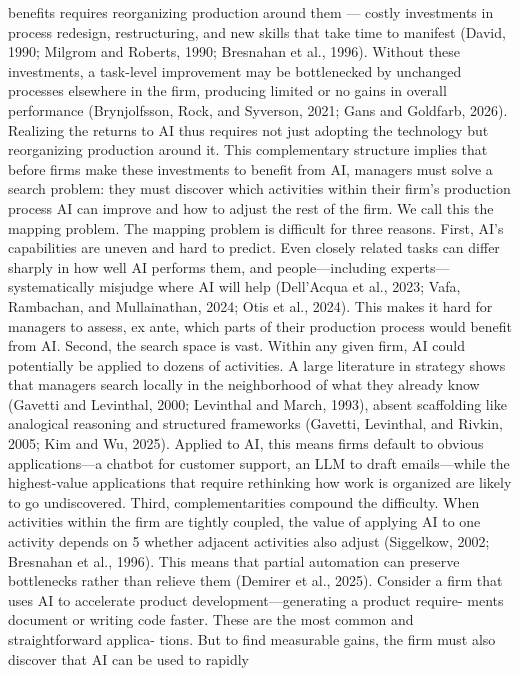 benefits requires reorganizing production around them — costly investments in process redesign,
restructuring, and new skills that take time to manifest (David, 1990; Milgrom and Roberts, 1990;
Bresnahan et al., 1996). Without these investments, a task-level improvement may be bottlenecked
by unchanged processes elsewhere in the firm, producing limited or no gains in overall performance
(Brynjolfsson, Rock, and Syverson, 2021; Gans and Goldfarb, 2026). Realizing the returns to AI
thus requires not just adopting the technology but reorganizing production around it.
This complementary structure implies that before firms make these investments to benefit from
AI, managers must solve a search problem: they must discover which activities within their firm’s
production process AI can improve and how to adjust the rest of the firm. We call this the mapping
problem.
The mapping problem is difficult for three reasons.
First, AI’s capabilities are uneven and
hard to predict. Even closely related tasks can differ sharply in how well AI performs them, and
people—including experts—systematically misjudge where AI will help (Dell’Acqua et al., 2023;
Vafa, Rambachan, and Mullainathan, 2024; Otis et al., 2024). This makes it hard for managers to
assess, ex ante, which parts of their production process would benefit from AI. Second, the search
space is vast. Within any given firm, AI could potentially be applied to dozens of activities. A large
literature in strategy shows that managers search locally in the neighborhood of what they already
know (Gavetti and Levinthal, 2000; Levinthal and March, 1993), absent scaffolding like analogical
reasoning and structured frameworks (Gavetti, Levinthal, and Rivkin, 2005; Kim and Wu, 2025).
Applied to AI, this means firms default to obvious applications—a chatbot for customer support,
an LLM to draft emails—while the highest-value applications that require rethinking how work is
organized are likely to go undiscovered. Third, complementarities compound the difficulty. When
activities within the firm are tightly coupled, the value of applying AI to one activity depends on
5
whether adjacent activities also adjust (Siggelkow, 2002; Bresnahan et al., 1996). This means that
partial automation can preserve bottlenecks rather than relieve them (Demirer et al., 2025).
Consider a firm that uses AI to accelerate product development—generating a product require-
ments document or writing code faster. These are the most common and straightforward applica-
tions. But to find measurable gains, the firm must also discover that AI can be used to rapidly
